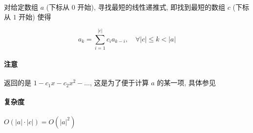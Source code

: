 对给定数组 \(a\) (下标从 \(0\) 开始), 寻找最短的线性递推式, 即找到最短的数组 \(c\) (下标从 \(1\) 开始) 使得

\[
    a_k=\sum_{i=1}^{|c|} c_i a_{k-i},\quad \forall |c|\leq k < |a|
\]

\paragraph{注意}

返回的是 \(1-c_1 x -c_2 x^2-\dots\), 这是为了便于计算 \(a\) 的某一项, 具体参见 

\paragraph{复杂度}

\(O(|a|\cdot |c|)=O\left(|a|^2\right)\)
